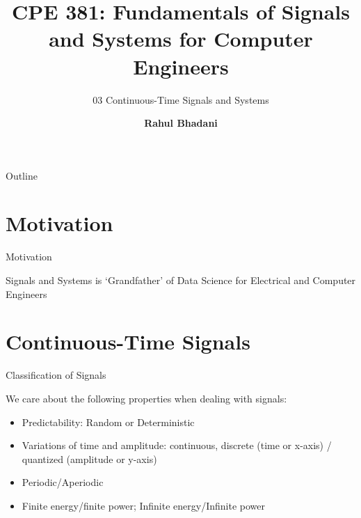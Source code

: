 \documentclass[aspectratio=169,xcolor=dvipsnames,svgnames,x11names,fleqn]{beamer}
\title[CPE 381: Signals and Systems]{CPE 381: Fundamentals of Signals and Systems for Computer Engineers} %
\subtitle{03 Continuous-Time Signals and Systems}
\author[Rahul Bhadani] {{\Large \textbf{Rahul Bhadani}}}
\institute[UAH] %
{
    Electrical \& Computer Engineering,  The University of Alabama in Huntsville
}
\date
\begin{document}
\begin{frame}
    \titlepage
\end{frame}

\begin{frame}{Outline}
    \tableofcontents
\end{frame}

\section{Motivation}


\begin{frame}{}
    \begin{center}
    \Huge \bf \color{DarkBlue}
    \faFire
    
    Motivation
\end{center}
\end{frame}


\begin{frame}{}
    \begin{center}
    \Huge \bf 
    
    Signals and Systems is `Grandfather' of Data Science for Electrical and Computer Engineers

\end{center}
\end{frame}

\section{Continuous-Time Signals}

\begin{frame}
    \sectionpage
\end{frame}

\begin{frame}{Classification of Signals}

We care about the following properties when dealing with signals:

\begin{itemize}
    \item Predictability:  Random or Deterministic
    \item Variations of time and amplitude: continuous, discrete (time or x-axis) / quantized (amplitude or y-axis)
    \item Periodic/Aperiodic
    \item Finite energy/finite power;  Infinite energy/Infinite power

\end{itemize}

\end{frame}
\end{document}
